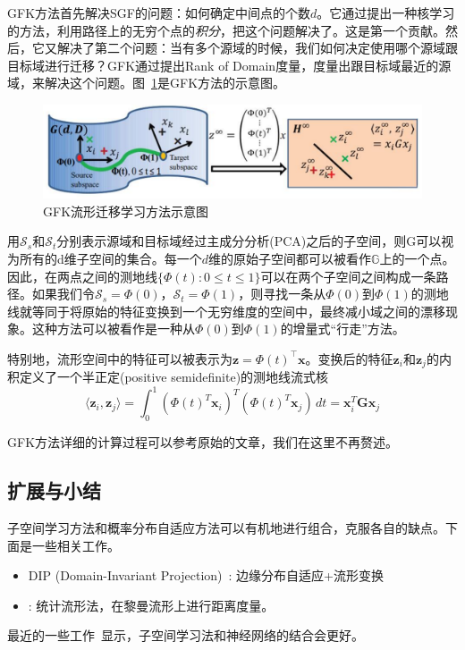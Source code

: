 GFK方法首先解决SGF的问题：如何确定中间点的个数$d$。它通过提出一种核学习的方法，利用路径上的无穷个点的\textit{积分}，把这个问题解决了。这是第一个贡献。然后，它又解决了第二个问题：当有多个源域的时候，我们如何决定使用哪个源域跟目标域进行迁移？GFK通过提出Rank of Domain度量，度量出跟目标域最近的源域，来解决这个问题。图~\ref{fig-subspace-gfk}是GFK方法的示意图。

\begin{figure}[htbp]
	\centering
	\includegraphics[scale=0.5]{./figures/fig-subspace-gfk.pdf}
	\caption{GFK流形迁移学习方法示意图}
	\label{fig-subspace-gfk}
\end{figure}

用$\mathcal{S}_s$和$\mathcal{S}_t$分别表示源域和目标域经过主成分分析(PCA)之后的子空间，则G可以视为所有的d维子空间的集合。每一个$d$维的原始子空间都可以被看作$\mathbb{G}$上的一个点。因此，在两点之间的测地线$\{\Phi(t):0 \leq t \leq 1\}$可以在两个子空间之间构成一条路径。如果我们令$\mathcal{S}_s=\Phi(0)$，$\mathcal{S}_t=\Phi(1)$，则寻找一条从$\Phi\left(0\right)$到$\Phi\left(1\right)$的测地线就等同于将原始的特征变换到一个无穷维度的空间中，最终减小域之间的漂移现象。这种方法可以被看作是一种从$\Phi\left(0\right)$到$\Phi\left(1\right)$的增量式“行走”方法。

特别地，流形空间中的特征可以被表示为$\mathbf{z}=\Phi\left(t\right)^\top \mathbf{x}$。变换后的特征$\mathbf{z}_i$和$\mathbf{z}_j$的内积定义了一个半正定(positive semidefinite)的测地线流式核
\begin{equation}
	\langle\mathbf{z}_i,\mathbf{z}_j\rangle= \int_{0}^{1} (\Phi(t)^T \mathbf{x}_i)^T (\Phi(t)^T \mathbf{x}_j) \, dt = \mathbf{x}^T_i \mathbf{G} \mathbf{x}_j
\end{equation}

GFK方法详细的计算过程可以参考原始的文章，我们在这里不再赘述。

\subsection{扩展与小结}

子空间学习方法和概率分布自适应方法可以有机地进行组合，克服各自的缺点。下面是一些相关工作。

\begin{itemize}
	\item DIP (Domain-Invariant Projection)~\cite{baktashmotlagh2013unsupervised}: 边缘分布自适应+流形变换
	\item \cite{baktashmotlagh2014domain}: 统计流形法，在黎曼流形上进行距离度量。
\end{itemize}

最近的一些工作~\cite{sun2016deep}显示，子空间学习法和神经网络的结合会更好。
